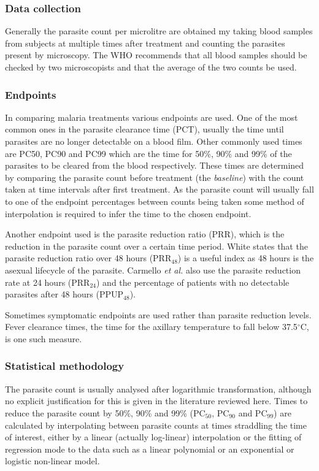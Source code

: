 \subsubsection*{Data collection}
Generally the parasite count per microlitre are obtained my taking blood samples from subjects at multiple times after treatment and counting the parasites present by microscopy. The WHO recommends that all blood samples should be checked by two microscopists and that the average of the two counts be used\cite{protocolWHO}.

\subsubsection*{Endpoints}
In comparing malaria treatments various endpoints are used. One of the most common ones in the parasite clearance time (PCT), usually the time until parasites are no longer detectable on a blood film\cite{white}. Other commonly used times are PC50, PC90 and PC99 which are the time for 50\%, 90\% and 99\% of the parasites to be cleared from the blood respectively. These times are determined by comparing the parasite count before treatment (the \textit{baseline}) with the count taken at time intervals after first treatment. As the parasite count will usually fall to one of the endpoint percentages between counts being taken some method of interpolation is required to infer the time to the chosen endpoint.

Another endpoint used is the parasite reduction ratio (PRR), which is the reduction in the parasite count over a certain time period. White\cite{white} states that the parasite reduction ratio over 48 hours (PRR$_{48}$) is a useful index as 48 hours is the asexual lifecycle of the parasite. Carmello \textit{et al.}\cite{carmello} also use the parasite reduction rate at 24 hours (PRR$_{24}$) and the percentage of patients with no detectable parasites after 48 hours (PPUP$_{48}$).

Sometimes symptomatic endpoints are used rather than parasite reduction levels.  Fever clearance times, the time for the axillary temperature to fall below 37.5$^\circ$C, is one such measure\cite{bell,newton}.

\subsubsection*{Statistical methodology}
The parasite count is usually analysed after logarithmic transformation\cite{wootton, vries, carmello}, although no explicit justification for this is given in the literature reviewed here. Times to reduce the parasite count by 50\%, 90\% and 99\% (PC$_{50}$, PC$_{90}$ and PC$_{99}$) are calculated by interpolating between parasite counts at times straddling the time of interest, either by a linear (actually log-linear) interpolation\cite{carmello, newton} or the fitting of regression mode to the data such as a linear polynomial\cite{vries} or an exponential\cite{vries} or logistic non-linear model\cite{wootton}.

